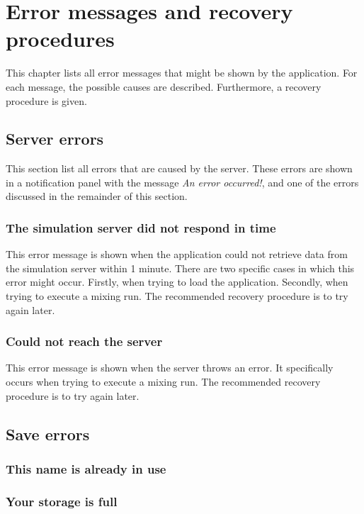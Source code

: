 \chapter{Error messages and recovery procedures}
This chapter lists all error messages that might be shown by the application. For each message, the possible causes are described. Furthermore, a recovery procedure is given.

\section {Server errors}
This section list all errors that are caused by the server. These errors are shown in a notification panel with the message \emph{An error occurred!}, and one of the errors discussed in the remainder of this section.

\subsection{The simulation server did not respond in time}
This error message is shown when the application could not retrieve data from the simulation server within 1 minute. There are two specific cases in which this error might occur. Firstly, when trying to load the application. Secondly, when trying to execute a mixing run. The recommended recovery procedure is to try again later.

\subsection{Could not reach the server}
This error message is shown when the server throws an error. It specifically occurs when trying to execute a mixing run. The recommended recovery procedure is to try again later.

\section{Save errors}

\subsection{This name is already in use}

\subsection{Your storage is full}

